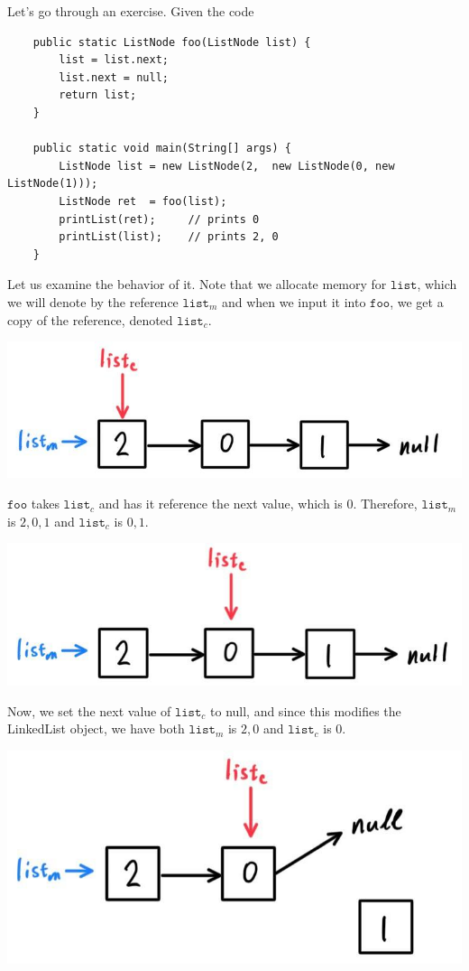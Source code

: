 \documentclass{article}
\begin{document}
    \begin{example}
    Let's go through an exercise. Given the code 
    \begin{lstlisting}
    public static ListNode foo(ListNode list) {
        list = list.next; 
        list.next = null; 
        return list; 
    }

    public static void main(String[] args) {
        ListNode list = new ListNode(2,  new ListNode(0, new ListNode(1))); 
        ListNode ret  = foo(list); 
        printList(ret);     // prints 0 
        printList(list);    // prints 2, 0 
    }
    \end{lstlisting}
    Let us examine the behavior of it. Note that we allocate memory for $\texttt{list}$, which we will denote by the reference $\texttt{list}_m$ and when we input it into $\texttt{foo}$, we get a copy of the reference, denoted $\texttt{list}_c$. 
    \begin{center}
        \includegraphics[scale=0.3]{img/step1.jpg}
    \end{center}
    $\texttt{foo}$ takes $\texttt{list}_c$ and has it reference the next value, which is $0$. Therefore, $\texttt{list}_m$ is $2, 0, 1$ and $\texttt{list}_c$ is $0, 1$. 
    \begin{center}
        \includegraphics[scale=0.3]{img/step2.jpg}
    \end{center}
    Now, we set the next value of $\texttt{list}_c$ to null, and since this modifies the LinkedList object, we have both $\texttt{list}_m$ is $2, 0$ and $\texttt{list}_c$ is $0$. 
    \begin{center}
        \includegraphics[scale=0.3]{img/step3.jpg}
    \end{center}
    \end{example}
\end{document}
